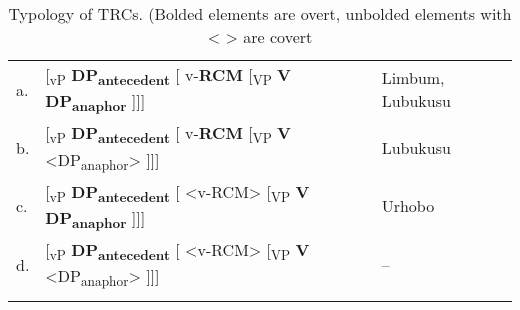 \documentclass[output=paper]{langsci/langscibook}
\begin{document}
\begin{table}
\caption{Typology of TRCs.     (Bolded elements are overt, unbolded elements with < > are covert}
\label{tab:Safir:1}

\begin{tabularx}{\textwidth}{llX}
\lsptoprule
a.&
[\textsubscript{vP} \textbf{DP\textsubscript{antecedent}} [ v-\textbf{RCM}   [\textsubscript{VP} \textbf{V}  \textbf{DP\textsubscript{anaphor}} ]]]
&Limbum, Lubukusu
\\
b.&
[\textsubscript{vP} \textbf{DP\textsubscript{antecedent}} [ v-\textbf{RCM}   [\textsubscript{VP} \textbf{V}  <DP\textsubscript{anaphor}> ]]]   &
Lubukusu  
\\
c.&  [\textsubscript{vP} \textbf{DP\textsubscript{antecedent}} [ <v-RCM>   [\textsubscript{VP} \textbf{V}  \textbf{DP\textsubscript{anaphor}} ]]]  &
Urhobo
\\
d. & [\textsubscript{vP} \textbf{DP\textsubscript{antecedent}} [ <v-RCM>   [\textsubscript{VP} \textbf{V}  <DP\textsubscript{anaphor}> ]]] &
--
\\
\lspbottomrule
\end{tabularx}
\end{table} 
\end{document}
